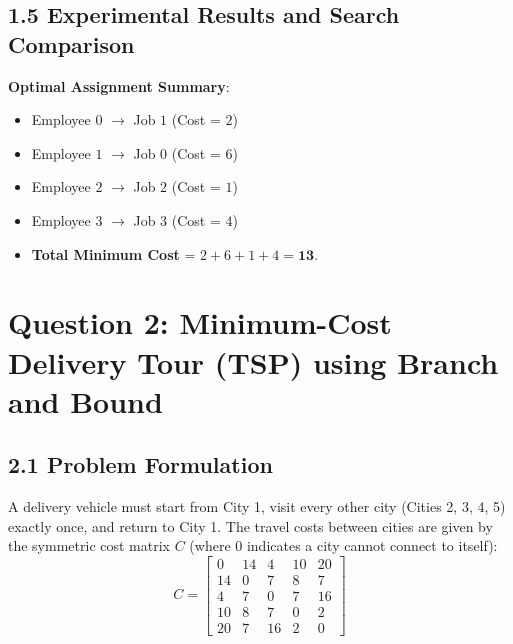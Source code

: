 \documentclass[12pt]{article}
\begin{document}
\subsection*{1.5 Experimental Results and Search Comparison}
\begin{table}[H]
\centering
{}
\caption{Empirical comparison between FIFO and LCBB for Job Assignment.}
\end{table}

\textbf{Optimal Assignment Summary}:
\begin{itemize}
    \item Employee $0$ $\to$ Job $1$ (Cost = $2$)
    \item Employee $1$ $\to$ Job $0$ (Cost = $6$)
    \item Employee $2$ $\to$ Job $2$ (Cost = $1$)
    \item Employee $3$ $\to$ Job $3$ (Cost = $4$)
    \item \textbf{Total Minimum Cost} = $2 + 6 + 1 + 4 = \mathbf{13}$.
\end{itemize}

\vspace{0.4cm}

\section*{Question 2: Minimum-Cost Delivery Tour (TSP) using Branch and Bound}

\subsection*{2.1 Problem Formulation}
A delivery vehicle must start from City 1, visit every other city (Cities 2, 3, 4, 5) exactly once, and return to City 1. The travel costs between cities are given by the symmetric cost matrix $C$ (where $0$ indicates a city cannot connect to itself):
\[
C = \begin{bmatrix}
0 & 14 & 4 & 10 & 20 \\
14 & 0 & 7 & 8 & 7 \\
4 & 7 & 0 & 7 & 16 \\
10 & 8 & 7 & 0 & 2 \\
20 & 7 & 16 & 2 & 0
\end{bmatrix}
\]
\end{document}
